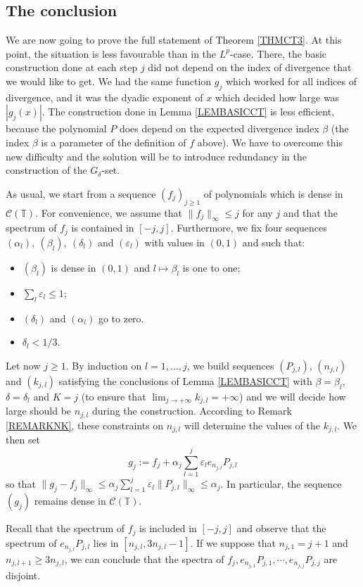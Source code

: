 \documentclass[11pt,a4paper]{amsart}
\theoremstyle{plain}
\begin{document}
\subsection{The conclusion}
We are now going to prove the full statement of Theorem \ref{THMCT3}. At this point, the situation is less favourable than in the
$L^p$-case. There, the basic construction done at each step $j$ did not depend on the index of divergence that we would like to get.
We had the same function $g_j$ which worked for all indices of divergence, and it was the dyadic exponent of $x$ which
decided how large was $|g_j(x)|$.
The construction done in Lemma \ref{LEMBASICCT} is less efficient, because the polynomial $P$ does depend on the expected divergence index $\beta$
(the index $\beta$ is a parameter of the definition of $f$ above). We have to overcome this new difficulty
and the solution will be to introduce redundancy in the construction of the $G_\delta$-set.

As usual, we start from a sequence $(f_j)_{j\ge 1}$ of polynomials which is dense in $\mathcal C({\mathbb T})$. For convenience, 
we assume that $\|f_j\|_\infty\leq j$ for any $j$ and that the spectrum of $f_j$ is contained in $[-j,j]$.
Furthermore, we fix four sequences $(\alpha_l),\ (\beta_l),\ (\delta_l)$ and $({\varepsilon}_l)$ with values in $(0,1)$ and such that:
\begin{itemize}
\item $(\beta_l)$ is dense in $(0,1)$ and $l\mapsto\beta_l$ is one to one;
\item $\sum_l {\varepsilon}_l\leq 1$;
\item $(\delta_l)$ and $(\alpha_l)$ go to zero.
\item $\delta_l<1/3$.
\end{itemize}
Let now $j\geq 1$. By induction on $l=1,\dots,j$, we build sequences $(P_{j,l})$, $(n_{j,l})$ and $(k_{j,l})$ 
satisfying the conclusions of Lemma \ref{LEMBASICCT} with $\beta=\beta_l$,
$\delta=\delta_l$ and $K=j$ (to ensure that $\lim_{j\to
  +\infty}k_{j,l}=+\infty$) and we will decide how large should be $n_{j,l}$ during
the construction. According to Remark \ref{REMARKNK}, these constraints on
$n_{j,l}$ will
determine the values of the $k_{j,l}$. We then set
$$g_j:=f_j+\alpha_j\sum_{l=1}^j {\varepsilon}_l e_{n_{j,l}}P_{j,l}$$
so that $\|g_j-f_j\|_\infty\leq \alpha_j\sum_{l=1}^j {\varepsilon}_l \|P_{j,l}\|_\infty\leq \alpha_j$. In particular, the sequence 
$(g_j)$ remains dense in $\mathcal C({\mathbb T})$. 

Recall that the spectrum of $f_j$ is included in $[-j,j]$ and observe that 
the spectrum of $e_{n_{j,l}}P_{j,l}$ lies in $[n_{j,l},3n_{j,l}-1]$. If we
suppose that $n_{j,1}=j+1$ and $n_{j,l+1}\ge 3n_{j,l}$, we can conclude that
the spectra of $f_j,e_{n_{j,1}}P_{j,1},\cdots,e_{n_{j,j}}P_{j,j}$ are disjoint.
\end{document}
